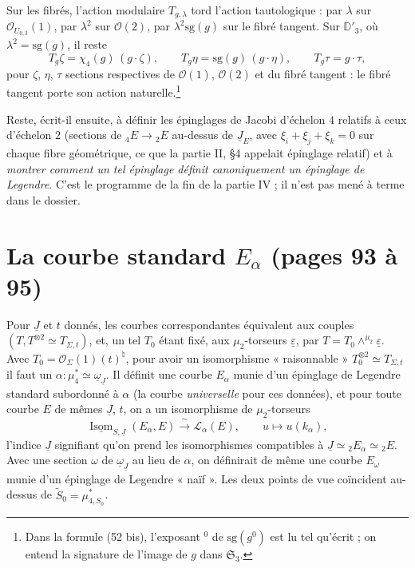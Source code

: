 \documentclass[11pt,a4paper]{article}
\begin{document}
Sur les fibrés, l'action modulaire $T_{g,\lambda}$ tord l'action tautologique :
par $\lambda$ sur $\mathcal{O}_{U_{0,3}}(1)$, par $\lambda^2$ sur
$\mathcal{O}(2)$, par $\lambda^2 \mathrm{sg}(g)$ sur le fibré tangent. Sur
$\mathbb{D}'_3$, où $\lambda^2 = \mathrm{sg}(g)$, il reste
\[
T_g \zeta = \chi_4(g)\,(g \cdot \zeta), \qquad T_g \eta = \mathrm{sg}(g)\,(g
\cdot \eta), \qquad T_g \tau = g \cdot \tau,
\]
pour $\zeta$, $\eta$, $\tau$ sections respectives de $\mathcal{O}(1)$,
$\mathcal{O}(2)$ et du fibré tangent : le fibré tangent porte son action
naturelle.\footnote{Dans la formule (52 bis), l'exposant $^{0}$ de
$\mathrm{sg}(g^{0})$ est lu tel qu'écrit ; on entend la signature de l'image de
$g$ dans $\mathfrak{S}_3$.}

Reste, écrit-il ensuite, à définir les épinglages de Jacobi d'échelon $4$
relatifs à ceux d'échelon $2$ (sections de ${}_4E \to {}_2E$ au-dessus de
$\underline{J}_E$, avec $\xi_i + \xi_j + \xi_k = 0$ sur chaque fibre
géométrique, ce que la partie II, §4 appelait épinglage relatif) et à
\emph{montrer comment un tel épinglage définit canoniquement un épinglage de
Legendre}. C'est le programme de la fin de la partie IV ; il n'est pas mené à
terme dans le dossier.

\section*{La courbe standard $E_\alpha$ (pages 93 à 95)}

Pour $\underline{J}$ et $t$ donnés, les courbes correspondantes équivalent aux
couples $(T, T^{\otimes 2} \simeq T_{\Sigma,t})$, et, un tel $T_0$ étant fixé,
aux $\mu_2$-torseurs $\underline{\varepsilon}$, par $T = T_0
\wedge^{\mu_2} \underline{\varepsilon}$. Avec $T_0 = \mathcal{O}_\Sigma(1)(t)^{\natural}$,
pour avoir un isomorphisme « raisonnable » $T_0^{\otimes 2} \simeq T_{\Sigma,t}$
il faut un $\alpha : \mu_4^{*} \simeq \underline{\omega}_{\underline{J}}$. Il
définit une courbe $E_\alpha$ munie d'un épinglage de Legendre standard
subordonné à $\alpha$ (la courbe \emph{universelle} pour ces données), et
pour toute courbe $E$ de mêmes $\underline{J}$, $t$, on a un isomorphisme de
$\mu_2$-torseurs
\[
\underline{\operatorname{Isom}}_{S, \underline{J}}(E_\alpha, E)
\xrightarrow{\;\sim\;} \mathcal{L}_\alpha(E), \qquad u \longmapsto u(k_\alpha),
\]
l'indice $\underline{J}$ signifiant qu'on prend les isomorphismes compatibles à
$\underline{J} \simeq {}_2E_\alpha \simeq {}_2E$. Avec une section $\omega$ de
$\underline{\omega}_{\underline{J}}$ au lieu de $\alpha$, on définirait de même
une courbe $E_\omega$ munie d'un épinglage de Legendre « naïf ». Les deux points
de vue coïncident au-dessus de $\widetilde{S}_0 = \mu^{*}_{4,S_0}$.
\end{document}
